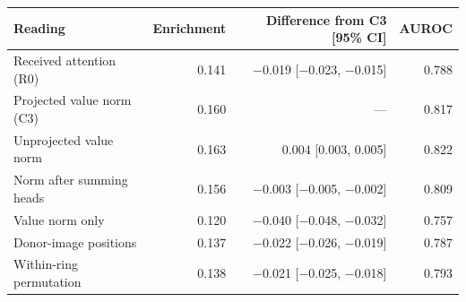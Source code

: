 \begin{tabular}{@{}lrrr@{}}
\toprule
Reading & Enrichment & Difference from C3 [95\% CI] & AUROC \\
\midrule
Received attention (R0) & 0.141 & $-$0.019 [$-$0.023, $-$0.015] & 0.788 \\
Projected value norm (C3) & 0.160 & --- & 0.817 \\
Unprojected value norm & 0.163 & 0.004 [0.003, 0.005] & 0.822 \\
Norm after summing heads & 0.156 & $-$0.003 [$-$0.005, $-$0.002] & 0.809 \\
Value norm only & 0.120 & $-$0.040 [$-$0.048, $-$0.032] & 0.757 \\
Donor-image positions & 0.137 & $-$0.022 [$-$0.026, $-$0.019] & 0.787 \\
Within-ring permutation & 0.138 & $-$0.021 [$-$0.025, $-$0.018] & 0.793 \\
\bottomrule
\end{tabular}
